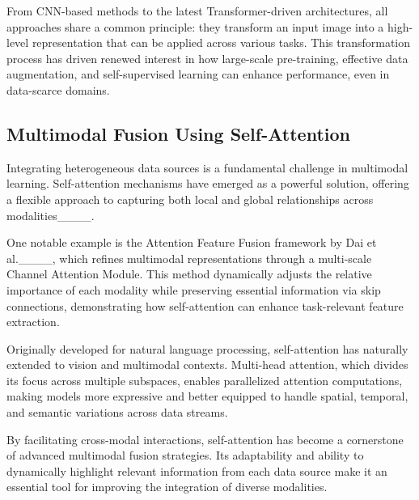 From CNN-based methods to the latest Transformer-driven architectures, all approaches share a common principle: they transform an input image into a high-level representation that can be applied across various tasks. This transformation process has driven renewed interest in how large-scale pre-training, effective data augmentation, and self-supervised learning can enhance performance, even in data-scarce domains.  

\subsection{Multimodal Fusion Using Self-Attention}

Integrating heterogeneous data sources is a fundamental challenge in multimodal learning. Self-attention mechanisms have emerged as a powerful solution, offering a flexible approach to capturing both local and global relationships across modalities____.  

One notable example is the Attention Feature Fusion framework by Dai et al.____, which refines multimodal representations through a multi-scale Channel Attention Module. This method dynamically adjusts the relative importance of each modality while preserving essential information via skip connections, demonstrating how self-attention can enhance task-relevant feature extraction.  

Originally developed for natural language processing, self-attention has naturally extended to vision and multimodal contexts. Multi-head attention, which divides its focus across multiple subspaces, enables parallelized attention computations, making models more expressive and better equipped to handle spatial, temporal, and semantic variations across data streams.  

By facilitating cross-modal interactions, self-attention has become a cornerstone of advanced multimodal fusion strategies. Its adaptability and ability to dynamically highlight relevant information from each data source make it an essential tool for improving the integration of diverse modalities.